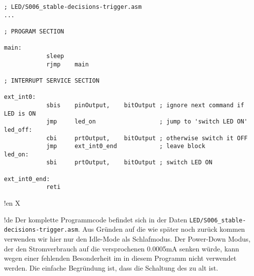 \begin{lstlisting}
; LED/S006_stable-decisions-trigger.asm
...

; PROGRAM SECTION

main:
            sleep
            rjmp    main

; INTERRUPT SERVICE SECTION

ext_int0:
            sbis    pinOutput,    bitOutput ; ignore next command if LED is ON
            jmp     led_on                  ; jump to 'switch LED ON'
led_off:
            cbi     prtOutput,    bitOutput ; otherwise switch it OFF
            jmp     ext_int0_end            ; leave block
led_on:
            sbi     prtOutput,    bitOutput ; switch LED ON

ext_int0_end:
            reti
\end{lstlisting}



!en X

!de Der komplette Programmcode befindet sich in der Daten \texttt{LED/S006\_stable-decisions-trigger.asm}. Aus Gründen auf die wie später noch zurück kommen verwenden wir hier nur den Idle-Mode als Schlafmodus. Der Power-Down Modus, der den Stromverbrauch auf die versprochenen 0.0005mA senken würde, kann wegen einer fehlenden Besonderheit im \at{} in diesem Programm nicht verwendet werden. Die einfache Begründung ist, dass die Schaltung des \at{} zu alt ist.
